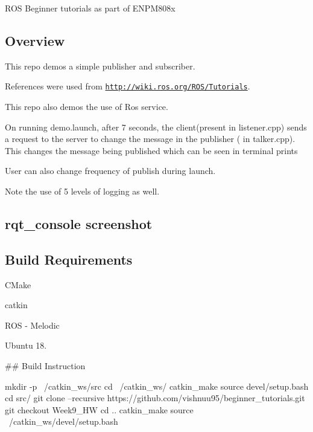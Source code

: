R\+OS Beginner tutorials as part of E\+N\+P\+M808x

\subsection*{Overview}


\begin{DoxyItemize}
\item This repo demos a simple publisher and subscriber.
\item References were used from \href{http://wiki.ros.org/ROS/Tutorials}{\tt http\+://wiki.\+ros.\+org/\+R\+O\+S/\+Tutorials}.
\item This repo also demos the use of Ros service.
\item On running demo.\+launch, after 7 seconds, the client(present in listener.\+cpp) sends a request to the server to change the message in the publisher ( in talker.\+cpp). This changes the message being published which can be seen in terminal prints
\item User can also change frequency of publish during launch.
\item Note the use of 5 levels of logging as well.
\end{DoxyItemize}

\subsection*{rqt\+\_\+console screenshot}



\subsection*{Build Requirements}


\begin{DoxyItemize}
\item C\+Make
\item catkin
\item R\+OS -\/ Melodic
\item Ubuntu 18.
\end{DoxyItemize}

\#\# Build Instruction 
\begin{DoxyCode}
mkdir -p ~/catkin\_ws/src
cd ~/catkin\_ws/
catkin\_make
source devel/setup.bash
cd src/
git clone --recursive https://github.com/vishnuu95/beginner\_tutorials.git
git checkout Week9\_HW
cd ..
catkin\_make
source ~/catkin\_ws/devel/setup.bash
\end{DoxyCode}


